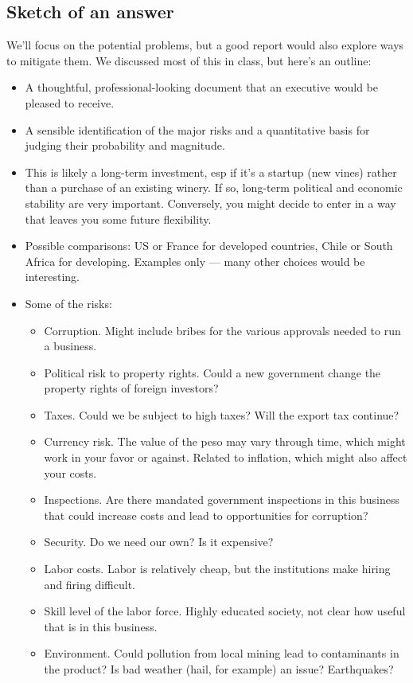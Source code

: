 \documentclass[letterpaper,12pt]{article}
\begin{document}
\newpage

\subsection*{Sketch of an answer} 

We'll focus on the potential problems, but a good report 
would also explore ways to mitigate them.  
We discussed most of this in class, 
but here's an outline:  
%
\begin{itemize}
\item A thoughtful, 
professional-looking document that an executive would be pleased to receive.  

\item A sensible identification of the major risks and 
a quantitative basis for judging their probability and magnitude.

\item This is likely a long-term investment, esp if it's a startup (new vines) rather than a purchase of an existing winery.  
If so, long-term  political and economic stability are very important. 
Conversely, you might decide to enter in a way that leaves 
you some future flexibility.

\item Possible comparisons:  US or France for developed countries, 
Chile or South Africa for developing.  Examples only --- 
many other choices would be interesting.  

\item Some of the risks:  
\begin{itemize}
\item Corruption.  Might include bribes for the various approvals needed to 
run a business.  
\item Political risk to property rights.  
Could a new government change 
the property rights of foreign investors?  
\item Taxes.  Could we be subject to high taxes? 
Will the export tax continue?  
\item Currency risk.  The value of the peso may vary through time, 
which might work in your favor or against.  
Related to inflation, which might also affect your costs.  
\item Inspections.  Are there mandated government inspections
in this business that could increase costs and lead to 
opportunities for corruption?  
\item Security.  Do we need our own?  Is it expensive?  
\item Labor costs.  Labor is relatively cheap, but the institutions
make hiring and firing difficult.  
\item Skill level of the labor force.  
Highly educated society, not clear how useful that is in this business.  
\item Environment.  Could pollution from local mining 
lead to contaminants in the product?  
Is bad weather (hail, for example) an issue?  
Earthquakes?


\end{itemize}
\end{itemize}
\end{document}
